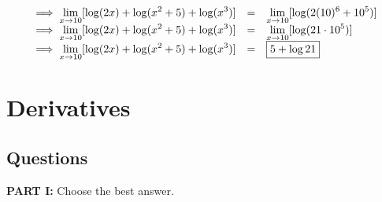 \documentclass[10pt,paper=letter]{scrartcl}
\begin{document}
\begin{enumerate}[resume, label=\arabic*.,font=\bfseries]
\begin{equation*}
\begin{array}{lll}
                      \implies  \displaystyle \mathop {\lim }\limits_{x \to 10} [ \log(2x) + \log (x^2 +5) + \log(x^3)] &  = & \displaystyle \mathop {\lim }\limits_{x \to 10} [ \log (2(10)^6+10^5) ]\\
                      
                      \implies  \displaystyle \mathop {\lim }\limits_{x \to 10} [ \log(2x) + \log (x^2 +5) + \log(x^3)] &  = & \displaystyle \mathop {\lim }\limits_{x \to 10} [ \log (21 \cdot 10^5) ]\\
                      
                         \implies  \displaystyle \mathop {\lim }\limits_{x \to 10} [ \log(2x) + \log (x^2 +5) + \log(x^3)] &  = & \fbox{$5 + \log 21$}\\
        \end{array}
    \end{equation*}
\end{enumerate}

\newpage

\section{Derivatives}

\subsection{Questions}

\textbf{PART I:} Choose the best answer.
\end{document}
